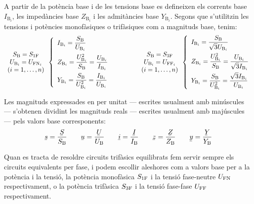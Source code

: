 A partir de la potència base i de les tensions base es
defineixen els corrents base $I_{\text{B}_i}$, les impedàncies base $Z_{\text{B}_i}$ i les
admitàncies base $Y_{\text{B}_i}$. Segons que s'utilitzin les tensions i potències monofàsiques o trifàsiques com a magnituds base, tenim:
\begin{equation}
\begin{array}{c}  S_\mathrm{B}=S_\mathrm{1F} \\ U_{\text{B}_i} = U_{\text{FN}_i} \\ (i=1,\ldots,n) \end{array}
\left\{
\begin{array}{l}
   I_{\text{B}_i} = \dfrac{S_\mathrm{B}}{U_{\text{B}_i}} \\[2.5ex]
   Z_{\text{B}_i} = \dfrac{U_{\text{B}_i}^2}{S_\mathrm{B}} = \dfrac{U_{\text{B}_i}}{I_{\text{B}_i}} \\[2.5ex]
   Y_{\text{B}_i} = \dfrac{S_\mathrm{B}}{U_{\text{B}_i}^2} = \dfrac{I_{\text{B}_i}}{U_{\text{B}_i}}
\end{array}
\right.
\qquad\qquad
\begin{array}{c} S_\mathrm{B}=S_\mathrm{3F} \\ U_{\text{B}_i} = U_{\text{FF}_i} \\ (i=1,\ldots,n) \end{array}
\left\{
\begin{array}{l}
   I_{\text{B}_i} = \dfrac{S_\mathrm{B}}{\sqrt{3} U_{\text{B}_i}} \\[2.5ex]
   Z_{\text{B}_i} = \dfrac{U_{\text{B}_i}^2}{S_\mathrm{B}}= \dfrac{U_{\text{B}_i}}{\sqrt{3} I_{\text{B}_i}} \\[2.5ex]
   Y_{\text{B}_i} = \dfrac{S_\mathrm{B}}{U_{\text{B}_i}^2} = \dfrac{\sqrt{3} I_{\text{B}_i}}{U_{\text{B}_i}}
\end{array}
\right.
\label{eq:bases_pu}
\end{equation}

Les magnituds expressades en per unitat --- escrites usualment amb minúscules --- s'obtenen
dividint les magnituds reals --- escrites usualment amb majúscules --- pels valors base corresponents:
\begin{equation}
   \cmplx{s} = \frac{\cmplx{S}}{S\ped{B}} \qquad \cmplx{u} = \frac{\cmplx{U}}{U\ped{B}} \qquad \cmplx{i} = \frac{\cmplx{I}}{I\ped{B}} \qquad \cmplx{z} = \frac{\cmplx{Z}}{Z\ped{B}} \qquad \cmplx{y} = \frac{\cmplx{Y}}{Y\ped{B}}
\end{equation}

Quan es tracta de resoldre circuits trifàsics equilibrats fem servir sempre els circuits equivalents per fase, i podem escollir aleshores com a valors base per a la potència i la tensió, la potència monofàsica $S_\mathrm{1F}$ i la tensió fase-neutre $U_\mathrm{FN}$ respectivament, o la potència trifàsica $S_\mathrm{3F}$ i la tensió fase-fase $U_\mathrm{FF}$ respectivament.


